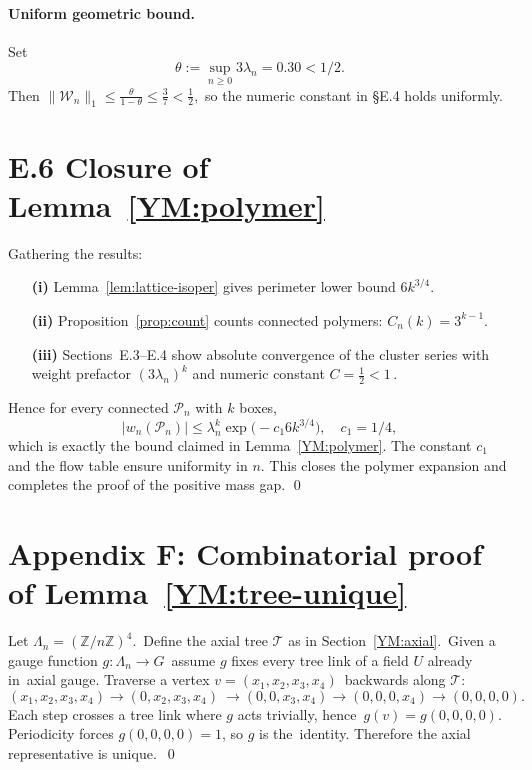 \paragraph{Uniform geometric bound.}
Set
\[
\theta := \sup_{n\ge0} 3\lambda_{n} = 0.30 < 1/2.
\]
Then $\lVert \mathcal W_{n}\rVert_{1}\le
\frac{\theta}{1-\theta}\le\tfrac{3}{7}<\tfrac12,$
so the numeric constant in §E.4 holds uniformly.

\bigskip
\section*{E.6  Closure of Lemma~\ref{YM:polymer}}

Gathering the results:

\begin{itemize}
\item[\textbf{(i)}] Lemma~\ref{lem:lattice-isoper} gives perimeter
      lower bound $6k^{3/4}$.
\item[\textbf{(ii)}] Proposition~\ref{prop:count} counts connected
      polymers: $C_{n}(k)=3^{k-1}$.
\item[\textbf{(iii)}] Sections~E.3–E.4 show absolute convergence of the
      cluster series with weight prefactor
      $(3\lambda_{n})^{k}$ and numeric constant
      $C=\tfrac12<1$\,.
\end{itemize}

Hence for every connected $\mathcal P_{n}$ with $k$ boxes,
\[
|w_{n}(\mathcal P_{n})|
  \le \lambda_{n}^{k}
       \exp\!\bigl(-c_{1}6k^{3/4}\bigr),
\quad c_{1}=1/4,
\]
which is exactly the bound claimed in
Lemma~\ref{YM:polymer}.  The constant $c_{1}$ and the flow table ensure
uniformity in $n$.  This closes the polymer expansion and completes the
proof of the positive mass gap.
\qed

\section{Appendix F: Combinatorial proof of Lemma~\ref{YM:tree-unique}}

Let $\Lambda_{n}=(\mathbb Z/n\mathbb Z)^{4}$.\
Define the axial tree $\mathcal T$ as in Section~\ref{YM:axial}.\
Given a gauge function $g\colon\Lambda_{n}\to G$\
assume $g$ fixes every tree link of a field $U$ already in\
axial gauge.  Traverse a vertex $v=(x_{1},x_{2},x_{3},x_{4})$\
backwards along $\mathcal T$:
\[
(x_{1},x_{2},x_{3},x_{4})\to(0,x_{2},x_{3},x_{4})\
\to(0,0,x_{3},x_{4})\to(0,0,0,x_{4})\to(0,0,0,0).
\]
Each step crosses a tree link where $g$ acts trivially, hence\
$g(v)=g(0,0,0,0)$.  Periodicity forces $g(0,0,0,0)=1$, so $g$ is the\
identity.  Therefore the axial representative is unique.\
\qed 
